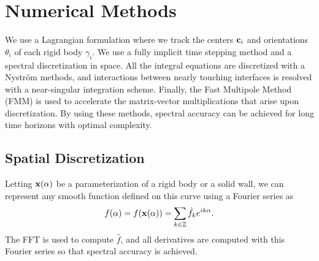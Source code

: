 \documentclass[preprint, 10pt]{elsarticle}
\begin{document}
		
\section{Numerical Methods\label{s:method}} 
We use a Lagrangian formulation where we track the centers ${\mathbf{c}}_i$ and
orientations $\theta_i$ of each rigid body $\gamma_i$.  We use a fully
implicit time stepping method and a spectral discretization in space.  All
the integral equations are discretized with a Nystr\"om  methods, and
interactions between nearly touching interfaces is resolved with a
near-singular integration scheme.  Finally, the Fast Multipole Method
(FMM) is used to accelerate the matrix-vector multiplications that arise
upon discretization.  By using these methods, spectral accuracy can be
achieved for long time horizons with optimal complexity.

\subsection{Spatial Discretization}
Letting ${\mathbf{x}}(\alpha)$ be a parameterization of a rigid body or a solid
wall, we can represent any smooth function defined on this curve using a
Fourier series as
\begin{align}
  f(\alpha) = f({\mathbf{x}}(\alpha)) = \sum_{k \in {\mathbb{Z}}} \hat{f}_k e^{ik\alpha}.
\end{align}
The FFT is used to compute $\hat{f}$, and all derivatives are computed
with this Fourier series so that spectral accuracy is achieved.
\end{document}
